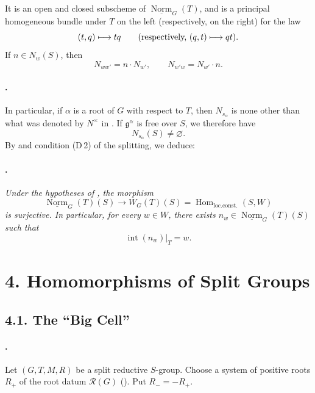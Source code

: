 It is an open and closed subscheme of
\(\underline{\operatorname{Norm}}_G(T)\), and is a principal
homogeneous bundle under \(T\) on the left \textup{(respectively,
on the right)} for the law
\[
  (t,q)\longmapsto tq
  \qquad
  \textup{(respectively, \((q,t)\longmapsto qt\))}.
\]
If \(n\in N_w(S)\), then
\[
  N_{ww'}=n\mathbin{\cdot}N_{w'},
  \qquad
  N_{w'w}=N_{w'}\mathbin{\cdot}n.
\]

\paragraph{.}
In particular, if \(\alpha\) is a root of \(G\) with respect to
\(T\), then \(N_{s_\alpha}\) is none other than what was denoted by
\(N^\times\) in . If \(\mathfrak g^\alpha\) is free
over \(S\), we therefore have
\[
  N_{s_\alpha}(S)\ne\varnothing.
\]
By  and condition \textup{(D\,2)} of the splitting, we deduce:

\paragraph{.}
\textit{Under the hypotheses of , the morphism}
\[
  \underline{\operatorname{Norm}}_G(T)(S)
  \longrightarrow
  W_G(T)(S)
  =
  \operatorname{Hom}_{\mathrm{loc.const.}}(S,W)
\]
\textit{is surjective. In particular, for every \(w\in W\), there
exists \(n_w\in\underline{\operatorname{Norm}}_G(T)(S)\) such that}
\[
  \operatorname{int}(n_w)|_T=w.
\]

\section*{4. Homomorphisms of Split Groups}

\subsection*{4.1. The ``Big Cell''}

\paragraph{.}
Let \((G,T,M,R)\) be a split reductive \(S\)-group. Choose a system
of positive roots \(R_+\) of the root datum \(\mathcal R(G)\)
\textup{()}. Put \(R_-=-R_+\).

